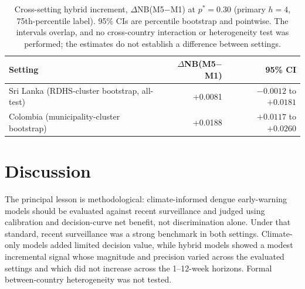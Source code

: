 \documentclass[11pt,a4paper]{article}
\begin{document}
\begin{table}[htbp]
\centering
\caption{Cross-setting hybrid increment, $\Delta$NB(M5$-$M1) at $p^*=0.30$ (primary $h=4$, 75th-percentile label). 95\% CIs are percentile bootstrap and pointwise. The intervals overlap, and no cross-country interaction or heterogeneity test was performed; the estimates do not establish a difference between settings.}
\label{tab:crosssetting}
\small
\begin{tabular}{lrr}
\toprule
Setting & $\Delta$NB(M5$-$M1) & 95\% CI \\
\midrule
Sri Lanka (RDHS-cluster bootstrap, all-test) & +0.0081 & $-0.0012$ to $+0.0181$ \\
Colombia (municipality-cluster bootstrap) & +0.0188 & $+0.0117$ to $+0.0260$ \\
\bottomrule
\end{tabular}
\end{table}

\section{Discussion}

The principal lesson is methodological: climate-informed dengue early-warning models should be evaluated against recent surveillance and judged using calibration and decision-curve net benefit, not discrimination alone. Under that standard, recent surveillance was a strong benchmark in both settings. Climate-only models added limited decision value, while hybrid models showed a modest incremental signal whose magnitude and precision varied across the evaluated settings and which did not increase across the 1--12-week horizons. Formal between-country heterogeneity was not tested.
\end{document}
